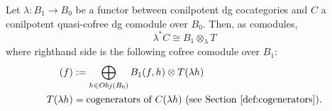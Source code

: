 %
%
\begin{prop}\label{prop:compute_pb}
Let $\lambda:B_1 \to B_0$ be a functor 
between conilpotent dg cocategories and 
$C$ a conilpotent quasi-cofree dg comodule 
over $B_0$. 
Then, as comodules,
\begin{equation}\label{eq:compute_pb}
\lambda^*C \cong 
B_1 \otimes_{\lambda} T 
\end{equation}
where righthand side is the following 
cofree comodule over $B_1$:
\begin{align*}
[B_1 \otimes_{\lambda} T](f)
&:= 
\bigoplus \limits_{h \in Obj(B_0)}
B_1(f, h) \otimes T(\lambda h)\\
T(\lambda h)
&=
\textrm{cogenerators of }C(\lambda h)
\textrm{ (see Section \ref{def:cogenerators}).}
\end{align*}
\end{prop}
%
